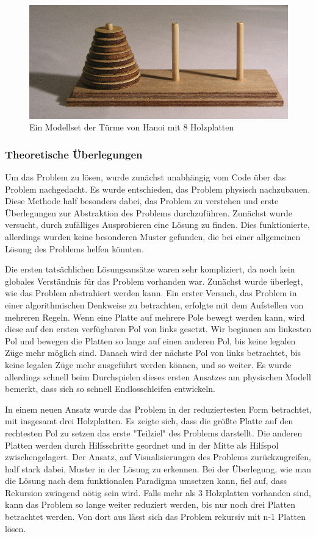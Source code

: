 \begin{figure}[H]
    \centering
    \includegraphics[width=1\linewidth]{Figures/Section_4/hanoi}
    \caption{Ein Modellset der Türme von Hanoi mit 8 Holzplatten \protect\cite{wikicommons}}
\end{figure}

\subsubsection{Theoretische Überlegungen}
Um das Problem zu lösen, wurde zunächst unabhängig vom Code über das Problem nachgedacht. Es wurde entschieden, das Problem physisch nachzubauen. Diese Methode half besonders dabei, das Problem zu verstehen und erste Überlegungen zur Abstraktion des Problems durchzuführen. Zunächst wurde versucht, durch zufälliges Ausprobieren eine Lösung zu finden. Dies funktionierte, allerdings wurden keine besonderen Muster gefunden, die bei einer allgemeinen Lösung des Problems helfen könnten.

Die ersten tatsächlichen Lösungsansätze waren sehr kompliziert, da noch kein globales Verständnis für das Problem vorhanden war. Zunächst wurde überlegt, wie das Problem abstrahiert werden kann. Ein erster Versuch, das Problem in einer algorithmischen Denkweise zu betrachten, erfolgte mit dem Aufstellen von mehreren Regeln. Wenn eine Platte auf mehrere Pole bewegt werden kann, wird diese auf den ersten verfügbaren Pol von links gesetzt. Wir beginnen am linkesten Pol und bewegen die Platten so lange auf einen anderen Pol, bis keine legalen Züge mehr möglich sind. Danach wird der nächste Pol von links betrachtet, bis keine legalen Züge mehr ausgeführt werden können, und so weiter.
Es wurde allerdings schnell beim Durchspielen dieses ersten Ansatzes am physischen Modell bemerkt, dass sich so schnell Endlosschleifen entwickeln.

In einem neuen Ansatz wurde das Problem in der reduziertesten Form betrachtet, mit insgesamt drei Holzplatten. Es zeigte sich, dass die größte Platte auf den rechtesten Pol zu setzen das erste "Teilziel" des Problems darstellt. Die anderen Platten werden durch Hilfsschritte geordnet und in der Mitte als Hilfspol zwischengelagert. Der Ansatz, auf Visualisierungen des Problems zurückzugreifen, half stark dabei, Muster in der Lösung zu erkennen.
Bei der Überlegung, wie man die Lösung nach dem funktionalen Paradigma umsetzen kann, fiel auf, dass Rekursion zwingend nötig sein wird. Falls mehr als 3 Holzplatten vorhanden sind, kann das Problem so lange weiter reduziert werden, bis nur noch drei Platten betrachtet werden. Von dort aus lässt sich das Problem rekursiv mit n-1 Platten lösen.

